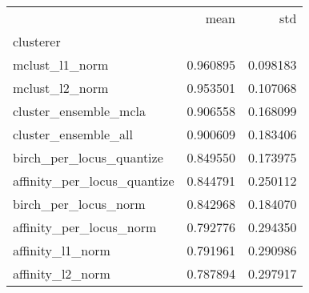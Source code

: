 \begin{tabular}{lrr}
\toprule
{} &      mean &       std \\
clusterer                   &           &           \\
\midrule
mclust\_l1\_norm              &  0.960895 &  0.098183 \\
mclust\_l2\_norm              &  0.953501 &  0.107068 \\
cluster\_ensemble\_mcla       &  0.906558 &  0.168099 \\
cluster\_ensemble\_all        &  0.900609 &  0.183406 \\
birch\_per\_locus\_quantize    &  0.849550 &  0.173975 \\
affinity\_per\_locus\_quantize &  0.844791 &  0.250112 \\
birch\_per\_locus\_norm        &  0.842968 &  0.184070 \\
affinity\_per\_locus\_norm     &  0.792776 &  0.294350 \\
affinity\_l1\_norm            &  0.791961 &  0.290986 \\
affinity\_l2\_norm            &  0.787894 &  0.297917 \\
\bottomrule
\end{tabular}

